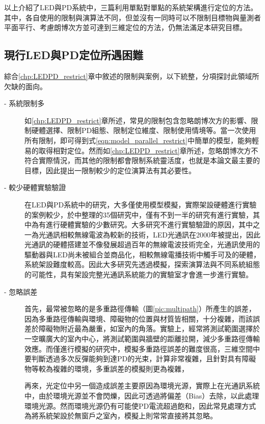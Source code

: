    以上介紹了LED與PD系統中，三篇利用單點對單點的系統架構進行定位的方法。其中，各自使用的限制與演算法不同，但並沒有一同時可以不限制目標物與量測者平面平行、考慮朗博次方並可達到三維定位的方法，仍無法滿足本研究目標。




\subsection{現行LED與PD定位所遇困難}
\label{chp:LEDPD_problem}
    
綜合\ref{chp:LEDPD_restrict}章中敘述的限制與案例，以下統整，分項探討此領域所欠缺的面向。

\begin{description}

    \item[- 系統限制多]\hfill 
    
    \qquad
    如\ref{chp:LEDPD_restrict}章所述，常見的限制包含忽略朗博次方的影響、限制硬體選擇、限制PD組態、限制定位維度、限制使用情境等。當一次使用所有限制，即可得到式\ref{eqn:model_parallel_restrict}中簡單的模型，能夠輕易的取得相對定位。然而如\ref{chp:LEDPD_restrict}章所述，忽略朗博次方不符合實際情況，而其他的限制都會限制系統靈活度，也就是本論文最主要的目標，因此提出一限制較少的定位演算法有其必要性。
    
    \item[- 較少硬體實驗驗證]\hfill 
    
    \qquad
    在LED與PD系統中的研究，大多僅使用模型模擬，實際架設硬體進行實驗的案例較少，於\cite{survey_light2018}中整理的35個研究中，僅有不到一半的研究有進行實驗，其中\cite{case:hypercube}\cite{case:3d_layers}為有進行硬體實驗的少數研究。大多研究不進行實驗驗證的原因，其中之一為光通訊相較無線電波為較新的技術，LED光通訊在2000年被提出\cite{vlc}，因此光通訊的硬體搭建並不像發展超過百年的無線電波技術完全，光通訊使用的驅動器與LED尚未被組合並商品化\cite{vlc_adv}，相較無線電播技術中觸手可及的硬體，系統架設難度較高。因此大多研究先透過模擬，探索演算法與不同系統組態的可能性，具有架設完整光通訊系統能力的實驗室才會進一步進行實驗。


    \item[- 忽略誤差]\hfill 

    \qquad
    首先，最常被忽略的是多重路徑傳輸（圖\ref{pic:multipath}）所產生的誤差，因為多重路徑傳輸與環境、障礙物的位置與材質皆相關，十分複雜，而該誤差於障礙物附近最為嚴重，如室內的角落。實驗上，經常將測試範圍選擇於一空曠廣大的室內中心，將測試範圍與牆壁的距離拉開，減少多重路徑傳輸效應。而僅進行模擬的研究中，模擬多重路徑誤差的難度很高\cite{multipath}，三維空間中要判斷透過多次反彈能夠到達PD的光束，計算非常複雜，且針對具有障礙物等較為複雜的環境，多重誤差的模擬則更為複雜，

    再來，光定位中另一個造成誤差主要原因為環境光源，實際上在光通訊系統中，由於環境光源並不會閃爍，因此可透過將偏差（Bias）去除，以此處理環境光源。然而環境光源仍有可能使PD電流超過飽和，因此常見處理方式為將系統架設於無窗戶之室內，模擬上則常常直接將其忽略。

\end{description}






